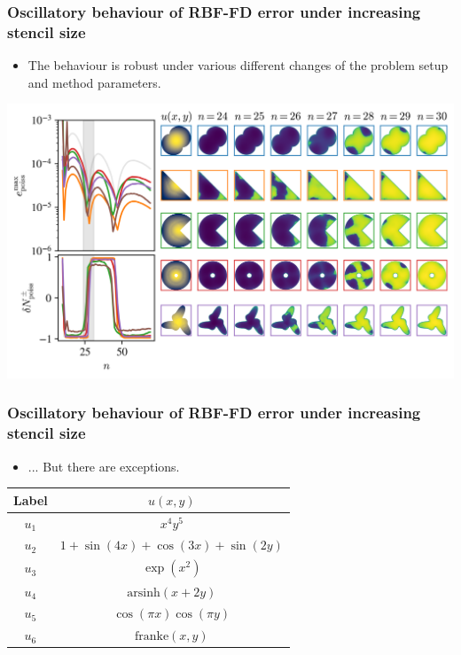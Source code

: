 \documentclass{beamer}
\begin{document}
\begin{frame}
\frametitle{Oscillatory behaviour of RBF-FD error under increasing stencil size}
\begin{itemize}
\item The behaviour is robust under various different changes of the problem setup and method parameters.
\end{itemize}
\includegraphics[width=.8\linewidth,center]{Figures/DifferentDomains.png}
\end{frame}

\begin{frame}
\frametitle{Oscillatory behaviour of RBF-FD error under increasing stencil size}
\begin{itemize}
\item ... But there are exceptions.
\end{itemize}
\begin{table}
\centering
\begin{tabular}{|c |c |}
 \hline
 Label & $u(x,y)$ \\ 
 \hline\hline
 $u_1$ & $x^4 y^5$ \\ 
\hline
 $u_2$ & $1+\sin(4x) + \cos(3x) + \sin(2y)$  \\ 
\hline
 $u_3$ & $\exp(x^2)$  \\ 
\hline
 $u_4$ & $\mathrm{arsinh}(x+2y)$  \\ 
\hline
 $u_5$ & $\cos(\pi x)\cos(\pi y)$  \\ 
\hline
 $u_6$ & $\mathrm{franke}(x,y)$ \\ 
\hline
\end{tabular}
\end{table}
\end{frame}
\end{document}
